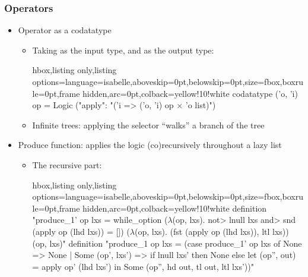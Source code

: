 \documentclass[aspectratio=169,10pt]{beamer}
\begin{document}
\begin{frame}[fragile]
  \frametitle{Operators}
  \begin{itemize}
    \item Operator as a codatatype
          \begin{itemize}
            \item Taking  as the input type, and  as the output type:
\begin{tcblisting}{hbox,listing only,listing options={language=isabelle,aboveskip=0pt,belowskip=0pt},size=fbox,boxrule=0pt,frame hidden,arc=0pt,colback=yellow!10!white}
codatatype ('o, 'i) op = Logic ("apply": "('i => ('o, 'i) op $\times$ 'o list)")
\end{tcblisting}
            \item Infinite trees: applying the selector  ``walks'' a branch of the tree
          \end{itemize}
    \item Produce function: applies the logic (co)recursively throughout a lazy list
          \begin{itemize}
            \item The recursive part:
\begin{tcblisting}{hbox,listing only,listing options={language=isabelle,aboveskip=0pt,belowskip=0pt},size=fbox,boxrule=0pt,frame hidden,arc=0pt,colback=yellow!10!white}
definition "produce_1' op lxs = while_option
  ($\lambda$(op, lxs). \<not> lnull lxs \<and> snd (apply op (lhd lxs)) = [])
  ($\lambda$(op, lxs). (fst (apply op (lhd lxs)), ltl lxs)) (op, lxs)"
definition "produce_1 op lxs =
  (case produce_1' op lxs of None => None
  | Some (op', lxs') => if lnull lxs' then None else
    let (op'', out) = apply op' (lhd lxs') in Some (op'', hd out, tl out, ltl lxs'))"
\end{tcblisting}
          \end{itemize}
  \end{itemize}
\end{frame}
\end{document}

